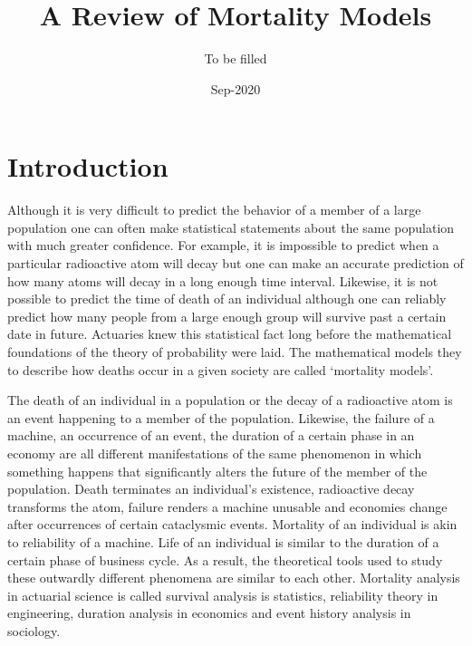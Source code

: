 \documentclass{article}
\title{A Review of Mortality Models}
\author{To be filled}
\date{Sep-2020}
\numberwithin{equation}{section}
\begin{document}
\maketitle
\section{Introduction}\label{s0}
Although it is very difficult to predict the behavior of a member of a large
population one can often make statistical statements about the same population 
with much greater 
confidence. For example, it is impossible to predict when a particular 
radioactive atom will decay but one can make an accurate prediction of how 
many atoms will decay in a long enough time interval. Likewise, it is not
possible to predict the time of death of an individual although one can reliably
predict how many people from a large enough group will survive past a certain
date in future. Actuaries knew this statistical fact long before the 
mathematical foundations of the theory of probability were laid. The 
mathematical models they to describe how deaths occur in a given society are
called `mortality models'.

The death of an individual in a population or the decay of a radioactive atom
is an event happening to a member of the population. Likewise, the failure of
a machine, an occurrence of an event, the duration of a certain phase in an
economy are all different manifestations of the same phenomenon in which 
something happens that significantly alters the future of the member of the
population. Death terminates an individual's existence, radioactive decay
transforms the atom, failure renders a machine unusable and economies change 
after occurrences of certain cataclysmic events. Mortality of an individual
is akin to reliability of a machine. Life of an individual is similar to
the duration of a certain phase of business cycle. As a result, the 
theoretical tools used to study these outwardly different phenomena are similar 
to each other. 
Mortality analysis in actuarial science is called survival analysis is 
statistics, reliability theory in engineering, duration analysis in economics 
and event history analysis in sociology.
\end{document}
